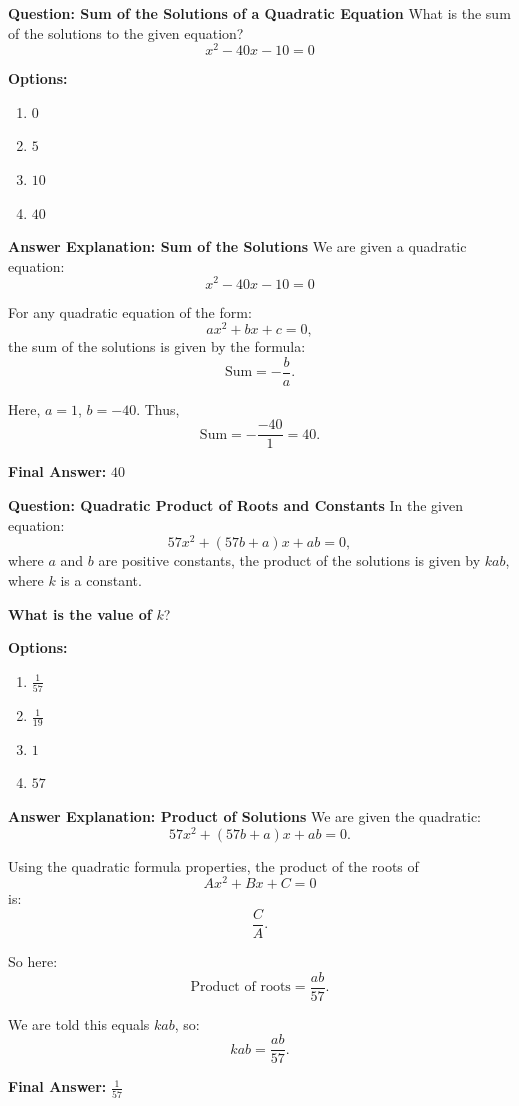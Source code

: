 \documentclass{beamer}
\begin{document}
\begin{frame}{\textbf{Question: Sum of the Solutions of a Quadratic Equation}}
What is the sum of the solutions to the given equation?
\[
x^2 - 40x - 10 = 0
\]

\textbf{Options:}
\begin{enumerate}
    \item[A.] \(0\)
    \item[B.] \(5\)
    \item[C.] \(10\)
    \item[D.] \(40\)
\end{enumerate}
\end{frame}
\begin{frame}{\textbf{Answer Explanation: Sum of the Solutions}}
We are given a quadratic equation:
\[
x^2 - 40x - 10 = 0
\]

For any quadratic equation of the form:
\[
ax^2 + bx + c = 0,
\]
the sum of the solutions is given by the formula:
\[
\text{Sum} = -\frac{b}{a}.
\]

Here, \(a = 1\), \(b = -40\). Thus,
\[
\text{Sum} = -\frac{-40}{1} = 40.
\]

\textbf{Final Answer:} \(\boxed{40}\)
\end{frame}


\begin{frame}{\textbf{Question: Quadratic Product of Roots and Constants}}
In the given equation:
\[
57x^2 + (57b + a)x + ab = 0,
\]
where \(a\) and \(b\) are positive constants, the product of the solutions is given by \(kab\), where \(k\) is a constant.

\textbf{What is the value of } \(k\)?

\vspace{0.5cm}
\textbf{Options:}
\begin{enumerate}
    \item[A.] \(\frac{1}{57}\)
    \item[B.] \(\frac{1}{19}\)
    \item[C.] \(1\)
    \item[D.] \(57\)
\end{enumerate}
\end{frame}



\begin{frame}{\textbf{Answer Explanation: Product of Solutions}}
We are given the quadratic:
\[
57x^2 + (57b + a)x + ab = 0.
\]

Using the quadratic formula properties, the product of the roots of
\[
Ax^2 + Bx + C = 0
\]
is:
\[
\frac{C}{A}.
\]

So here:
\[
\text{Product of roots} = \frac{ab}{57}.
\]

We are told this equals \(kab\), so:
\[
kab = \frac{ab}{57}.
\]

\textbf{Final Answer:} \(\boxed{\frac{1}{57}}\)
\end{frame}
\end{document}
